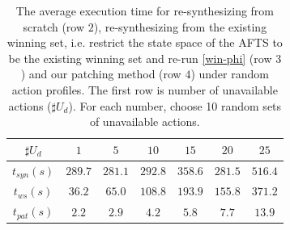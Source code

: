 \begin{table}
	\centering
	\caption{The average execution time for re-synthesizing from scratch (row $ 2 $), re-synthesizing from the existing winning set, i.e. restrict the state space of the AFTS to be the existing winning set and re-run \eqref{win-phi} (row $ 3 $) and our patching method (row $ 4 $) under random action profiles. The first row is number of unavailable actions ($ \sharp U_d $). For each number, choose 10 random sets of unavailable actions.}
	\begin{tabular}{ccccccc}
		\hline 
		$ \sharp U_d $ & $ 1 $ &$ 5 $ & $ 10 $ & $ 15 $ & $ 20 $ & $ 25 $ \\ 
		\hline 
		$ t_{syn}(s) $ & $ 289.7 $ & $ 281.1 $ & $ 292.8 $ & $ 358.6 $ &  $ 281.5 $ & $ 516.4 $ \\
		$t_{ws} (s)$ & $ 36.2 $ & $ 65.0 $ & $ 108.8 $ & $ 193.9 $ & $ 155.8 $ & $ 371.2 $\\
		$ t_{pat}(s)$ & $ 2.2 $ & $ 2.9 $ & $ 4.2 $ & $ 5.8 $ & $ 7.7 $ & $ 13.9 $ \\ 
		\hline 
	\end{tabular} 
	\label{tab: exper2}
\end{table}

